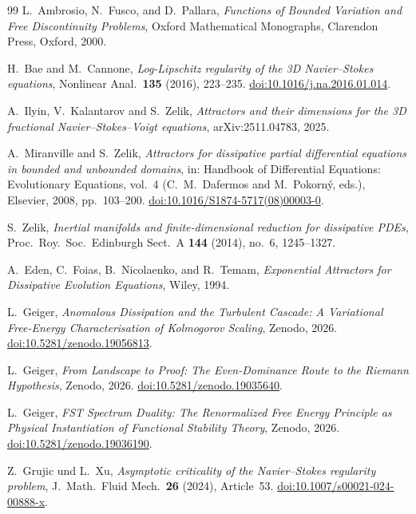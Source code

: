 \documentclass[12pt,a4paper]{article}
\theoremstyle{definition}
\theoremstyle{plain}
\theoremstyle{remark}
\begin{document}
\begin{thebibliography}{99}
L.~Ambrosio, N.~Fusco, and D.~Pallara,
\emph{Functions of Bounded Variation and Free Discontinuity Problems},
Oxford Mathematical Monographs, Clarendon Press, Oxford, 2000.

H.~Bae and M.~Cannone,
\emph{Log-Lipschitz regularity of the 3D Navier--Stokes equations},
Nonlinear Anal.\ \textbf{135} (2016), 223--235.
\href{https://doi.org/10.1016/j.na.2016.01.014}{doi:10.1016/j.na.2016.01.014}.

A.~Ilyin, V.~Kalantarov and S.~Zelik,
\emph{Attractors and their dimensions for the 3D fractional
Navier--Stokes--Voigt equations},
arXiv:2511.04783, 2025.

A.~Miranville and S.~Zelik,
\emph{Attractors for dissipative partial differential equations in bounded and unbounded domains},
in: Handbook of Differential Equations: Evolutionary Equations, vol.~4 (C.~M.~Dafermos and M.~Pokorn\'y, eds.), Elsevier, 2008, pp.~103--200.
\href{https://doi.org/10.1016/S1874-5717(08)00003-0}{doi:10.1016/S1874-5717(08)00003-0}.

S.~Zelik,
\emph{Inertial manifolds and finite-dimensional reduction for
dissipative PDEs},
Proc.\ Roy.\ Soc.\ Edinburgh Sect.~A \textbf{144} (2014), no.~6,
1245--1327.

A.~Eden, C.~Foias, B.~Nicolaenko, and R.~Temam,
\emph{Exponential Attractors for Dissipative Evolution Equations},
Wiley, 1994.

L.~Geiger, \emph{Anomalous Dissipation and the Turbulent Cascade:
A Variational Free-Energy Characterisation of Kolmogorov Scaling},
Zenodo, 2026.
\href{https://doi.org/10.5281/zenodo.19056813}{doi:10.5281/zenodo.19056813}.

L.~Geiger, \emph{From Landscape to Proof: The Even-Dominance Route to the Riemann Hypothesis},
Zenodo, 2026.
\href{https://doi.org/10.5281/zenodo.19035640}{doi:10.5281/zenodo.19035640}.

L.~Geiger, \emph{FST Spectrum Duality: The Renormalized Free Energy Principle as Physical Instantiation of Functional Stability Theory},
Zenodo, 2026.
\href{https://doi.org/10.5281/zenodo.19036190}{doi:10.5281/zenodo.19036190}.

Z.~Grujic und L.~Xu,
\emph{Asymptotic criticality of the Navier--Stokes regularity problem},
J.~Math.\ Fluid Mech.\ \textbf{26} (2024), Article~53.
\href{https://doi.org/10.1007/s00021-024-00888-x}{doi:10.1007/s00021-024-00888-x}.


\end{thebibliography}
\end{document}
